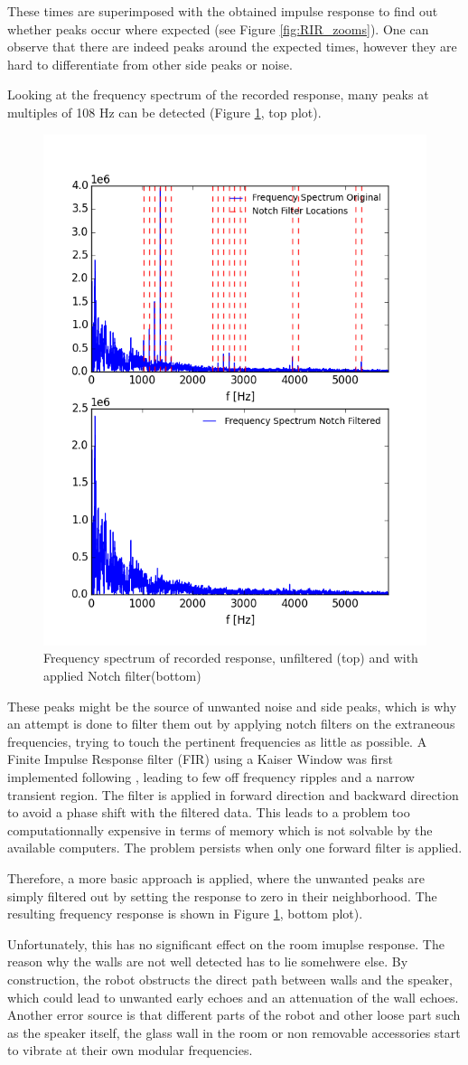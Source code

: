 These times are superimposed with the obtained impulse response to find out whether peaks occur where expected (see Figure \ref{fig:RIR_zooms}).
One can observe that there are indeed peaks around the expected times, however they are hard to differentiate from other side peaks or noise.


Looking at the frequency spectrum of the recorded response, many peaks at multiples of 108 Hz can be detected (Figure \ref{fig:RIR_filtered}, top plot). 
\begin{figure}[H]
    \centering
    \includegraphics[width=.5\linewidth]{files/NotchY.png}
    \caption{Frequency spectrum of recorded response, unfiltered (top) and with applied Notch filter(bottom)}
    \label{fig:RIR_filtered}
\end{figure}
These peaks might be the source of unwanted noise and side peaks, which is why an attempt is done to filter them out by applying notch filters on the extraneous frequencies, trying to touch the pertinent frequencies as little as possible. A Finite Impulse Response filter (FIR) using a Kaiser Window was first implemented following \cite{Notch}, leading to few off frequency ripples and a narrow transient region. The filter is applied in forward direction and backward direction to avoid a phase shift with the filtered data. This leads to a problem too computationnally expensive in terms of memory which is not solvable by the available computers. 
The problem persists when only one forward filter is applied. 

Therefore, a more basic approach is applied, where the unwanted peaks are simply filtered out by setting the response to zero in their neighborhood. The resulting frequency response is shown in Figure \ref{fig:RIR_filtered}, bottom plot). 


Unfortunately, this has no significant effect on the room imuplse response.
The reason why the walls are not well detected has to lie somehwere else. 
By construction, the robot obstructs the direct path between walls and the speaker, which could lead to unwanted early echoes and an attenuation of the wall echoes.
Another error source is that different parts of the robot and other loose part such as the speaker itself, the glass wall in the room or non removable accessories start to vibrate at their own modular frequencies.

